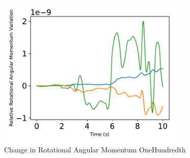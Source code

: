 \begin{figure}[htbp]\centerline{\includegraphics[width=0.8\textwidth]{AutoTeX/ChangeInRotationalAngularMomentumOneHundredth}}\caption{Change in Rotational Angular Momentum OneHundredth}\label{fig:ChangeInRotationalAngularMomentumOneHundredth}\end{figure}